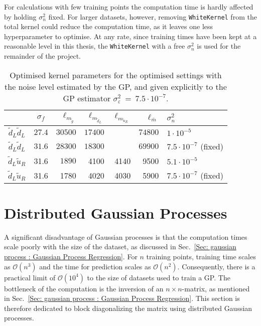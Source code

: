 \documentclass[twoside,english]{uiofysmaster}
\begin{document}
{{For calculations with few training points the computation time is hardly affected by holding $\sigma_n^2$ fixed. For larger datasets, however, removing \verb|WhiteKernel| from the total kernel could reduce the computation time, as it leaves one less hyperparameter to optimise. At any rate, since training times have been kept at a reasonable level in this thesis, the \verb|WhiteKernel| with a free $\sigma_n^2$ is used for the remainder of the project.



  

\begin{table}
\centering
\begin{tabular}{@{}ccrrrrl@{}} \toprule
& $\sigma_f$ & $\ell_{m_{\widetilde{g}}}$ & $\ell_{m_{\widetilde{d}_L}}$ &$\ell_{m_{\widetilde{u}_R}}$ & $\ell_{\bar{m}}$ & $\sigma_n^2$\\
\midrule
$\widetilde{d}_L \widetilde{d}_L$ & $27.4$ & $30500$ & $17400$ && $74800$ & $1 \cdot 10^{-5}$\\
$\widetilde{d}_L \widetilde{d}_L$ & $31.6$ &  $28300$ & $18300$ && $69900$ & $7.5 \cdot 10^{-7}$ (fixed)\\
$\widetilde{d}_L \widetilde{u}_R$ & 31.6 & $1890$  & 4100 & 4140 & 9500 & $5.1 \cdot 10^{-5}$\\
$\widetilde{d}_L \widetilde{u}_R$ & 31.6& 1780&4020 &4030&5900 & $7.5 \cdot 10^{-7}$ (fixed)\\ \bottomrule
\end{tabular}
\caption{Optimised kernel parameters for the optimised settings with the noise level estimated by the GP, and given explicitly to the GP estimator $\sigma_{\varepsilon}^2~=~7.5 \cdot 10^{-7}$.}
\label{Tab:: evaluating cross : optimal kernel parameters alpha}
\end{table}





\section{Distributed Gaussian Processes}\label{Sec:: gaussian process : Distributed Gaussian Processes}



A significant disadvantage of Gaussian processes is that the computation times scale poorly with the size of the dataset, as discussed in Sec.~\ref{Sec: gaussian process : Gaussian Process Regression}. For $n$ training points, training time scales as $\mathcal{O}(n^3)$ and the time for prediction scales as $\mathcal{O}(n^2)$. Consequently, there is a practical limit of $\mathcal{O}(10^4)$ to the size of datasets used to train a GP. The bottleneck of the computation is the inversion of an $n \times n$-matrix, as mentioned in Sec.~\ref{Sec: gaussian process : Gaussian Process Regression}. This section is therefore dedicated to block diagonalizing the matrix using distributed Gaussian processes.

}}
\end{document}
